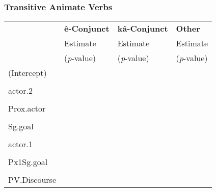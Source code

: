     \subsubsection{Transitive Animate Verbs}
                \begin{table}[H]
                \centering
                \begin{tabular}{llll}
                    \toprule
                                & \textbf{ê-Conjunct}   & \textbf{kâ-Conjunct}  & \textbf{Other} \\
                                & Estimate     & Estimate     & Estimate\\
                                & (\textit{p}-value) & (\textit{p}-value) & (\textit{p}-value) \\
                    \midrule
                    (Intercept)          &           &        & \cellcolor[HTML]{EA9999}{-2.601} \\
                     &           &        & \cellcolor[HTML]{EA9999}{(0.022)}  \\
actor.2              & \cellcolor[HTML]{EA9999}{-1.595}    &        & \cellcolor[HTML]{B6D7A8}{1.829}  \\
                     & \cellcolor[HTML]{EA9999}{($<$ 0.001)}       &        & \cellcolor[HTML]{B6D7A8}{($<$ 0.001)}      \\
Prox.actor           & \cellcolor[HTML]{EA9999}{-0.938}    & \cellcolor[HTML]{B6D7A8}{1.324}  &        \\
                     & \cellcolor[HTML]{EA9999}{(0.021)}   & \cellcolor[HTML]{B6D7A8}{(0.001)}  &        \\
Sg.goal              & \cellcolor[HTML]{EA9999}{-0.46}     & \cellcolor[HTML]{B6D7A8}{0.585}  &        \\
                     & \cellcolor[HTML]{EA9999}{(0.039)}   & \cellcolor[HTML]{B6D7A8}{(0.012)}  &        \\
actor.1              & \cellcolor[HTML]{B6D7A8}{0.432}     &        & \cellcolor[HTML]{EA9999}{-0.751} \\
                     & \cellcolor[HTML]{B6D7A8}{(0.007)}   &        & \cellcolor[HTML]{EA9999}{(0.001)}  \\
Px1Sg.goal           & \cellcolor[HTML]{B6D7A8}{0.695}     &        &        \\
                     & \cellcolor[HTML]{B6D7A8}{(0.048)}   &        &        \\
{PV.Discourse}       & \cellcolor[HTML]{B6D7A8}{1.359}     &        & \cellcolor[HTML]{EA9999}{-2.463} \\

\end{tabular}
\end{table}
